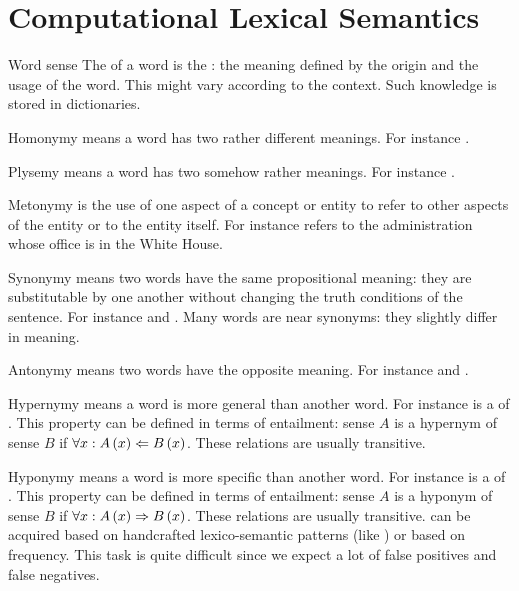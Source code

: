 \section{Computational Lexical Semantics}
\begin{df}{Word sense}
The \sb{} of a word is the : the meaning defined by the origin and the usage of the word. This might vary according to the context. Such knowledge is stored in dictionaries.
\end{df}
\begin{df}{Homonymy}
\sb{} means a word has two rather different meanings. For instance .
\end{df}
\begin{df}{Plysemy}
\sb{} means a word has two somehow rather meanings. For instance .
\end{df}
\begin{df}{Metonymy}
\sb{} is the use of one aspect of a concept or entity to refer to other aspects of the entity or to the entity itself. For instance  refers to the administration whose office is in the White House.
\end{df}
\begin{df}{Synonymy}
\sb{} means two words have the same propositional meaning: they are substitutable by one another without changing the truth conditions of the sentence. For instance  and . Many words are near synonyms: they slightly differ in meaning.
\end{df}
\begin{df}{Antonymy}
\sb{} means two words have the opposite meaning. For instance  and .
\end{df}
\begin{df}[Superordinate]{Hypernymy}
\sb{} means a word is more general than another word. For instance  is a  of . This property can be defined in terms of entailment: sense $A$ is a hypernym of sense $B$ if $\forall x:A\left(x\right)\Leftarrow B\left(x\right)$. These relations are usually transitive.
\end{df}
\begin{df}[Subordinate]{Hyponymy}
\sb{} means a word is more specific than another word. For instance  is a  of . This property can be defined in terms of entailment: sense $A$ is a hyponym of sense $B$ if $\forall x:A\left(x\right)\Rightarrow B\left(x\right)$. These relations are usually transitive. \sb{} can be acquired based on handcrafted lexico-semantic patterns (like ) or based on frequency. This task is quite difficult since we expect a lot of false positives and false negatives.
\end{df}
